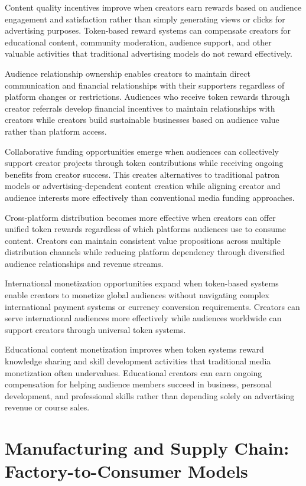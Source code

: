 \documentclass[
  Letterpaper,
]{scrbook}
\begin{document}
Content quality incentives improve when creators earn rewards based on
audience engagement and satisfaction rather than simply generating views
or clicks for advertising purposes. Token-based reward systems can
compensate creators for educational content, community moderation,
audience support, and other valuable activities that traditional
advertising models do not reward effectively.

Audience relationship ownership enables creators to maintain direct
communication and financial relationships with their supporters
regardless of platform changes or restrictions. Audiences who receive
token rewards through creator referrals develop financial incentives to
maintain relationships with creators while creators build sustainable
businesses based on audience value rather than platform access.

Collaborative funding opportunities emerge when audiences can
collectively support creator projects through token contributions while
receiving ongoing benefits from creator success. This creates
alternatives to traditional patron models or advertising-dependent
content creation while aligning creator and audience interests more
effectively than conventional media funding approaches.

Cross-platform distribution becomes more effective when creators can
offer unified token rewards regardless of which platforms audiences use
to consume content. Creators can maintain consistent value propositions
across multiple distribution channels while reducing platform dependency
through diversified audience relationships and revenue streams.

International monetization opportunities expand when token-based systems
enable creators to monetize global audiences without navigating complex
international payment systems or currency conversion requirements.
Creators can serve international audiences more effectively while
audiences worldwide can support creators through universal token
systems.

Educational content monetization improves when token systems reward
knowledge sharing and skill development activities that traditional
media monetization often undervalues. Educational creators can earn
ongoing compensation for helping audience members succeed in business,
personal development, and professional skills rather than depending
solely on advertising revenue or course sales.

\section{Manufacturing and Supply Chain: Factory-to-Consumer
Models}\label{manufacturing-and-supply-chain-factory-to-consumer-models}
\end{document}
